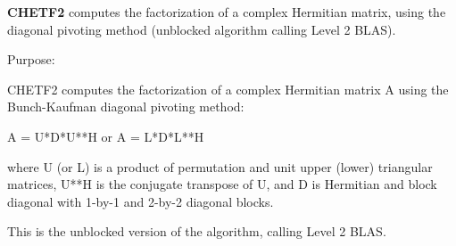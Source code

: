 {\bfseries C\+H\+E\+T\+F2} computes the factorization of a complex Hermitian matrix, using the diagonal pivoting method (unblocked algorithm calling Level 2 B\+L\+A\+S). 

 \begin{DoxyParagraph}{Purpose\+: }
\begin{DoxyVerb} CHETF2 computes the factorization of a complex Hermitian matrix A
 using the Bunch-Kaufman diagonal pivoting method:

    A = U*D*U**H  or  A = L*D*L**H

 where U (or L) is a product of permutation and unit upper (lower)
 triangular matrices, U**H is the conjugate transpose of U, and D is
 Hermitian and block diagonal with 1-by-1 and 2-by-2 diagonal blocks.

 This is the unblocked version of the algorithm, calling Level 2 BLAS.\end{DoxyVerb}
 
\end{DoxyParagraph}

